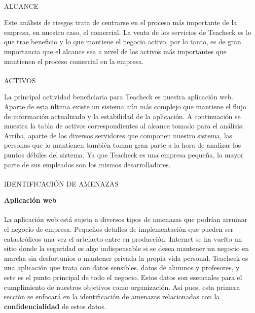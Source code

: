 \paragraph{}
ALCANCE

Este análisis de riesgos trata de centrarse en el proceso más
importante de la empresa, en nuestro caso, el comercial. La venta de
los servicios de Teacheck es lo que trae beneficio y lo que mantiene
el negocio activo, por lo tanto, es de gran importancia que el alcance
sea a nivel de los activos más importantes que mantienen el proceso
comercial en la empresa.

\paragraph{}
ACTIVOS

La principal actividad beneficiaria para Teacheck es nuestra
aplicación web. Aparte de esta última existe un sistema aún más
complejo que mantiene el flujo de información actualizado y la
estabilidad de la aplicación. A continuación se muestra la tabla de
activos correspondientes al alcance tomado para el análisis:
 Arriba,
aparte de los diversos servidores que componen nuestro sistema, las
personas que lo mantienen también toman gran parte a la hora de
analizar los puntos débiles del sistema. Ya que Teacheck es una
empresa pequeña, la mayor parte de sus empleados son los mismos
desarrolladores.

\paragraph{}
IDENTIFICACIÓN DE AMENAZAS

\textbf{Aplicación web}
\paragraph{}
La aplicación web está sujeta a diversos tipos de amenazas que podrían
arruinar el negocio de empresa. Pequeños detalles de implementación
que pueden ser catastróficos una vez el artefacto entre en
producción. Internet se ha vuelto un sitio donde la seguridad es algo
indispensable si se desea mantener un negocio en marcha sin
desfortunios o mantener privada la propia vida personal. Teacheck es
una aplicación que trata con datos sensibles, datos de alumnos y
profesores, y este es el punto principal de todo el negocio. Estos
datos son esenciales para el cumplimiento de nuestros objetivos como
organización. Así pues, esta primera sección se enfocará en la
identificación de amenazas relacionadas con la
\textbf{confidencialidad} de estos datos.

